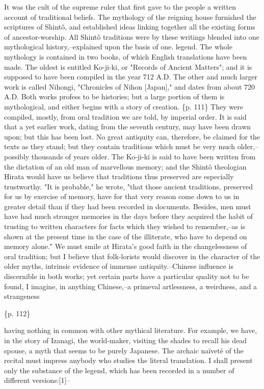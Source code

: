 It was the cult of the supreme ruler that first gave to the people a written account of traditional beliefs. The mythology of the reigning house furnished the scriptures of Shintô, and established ideas linking together all the existing forms of ancestor-worship. All Shintô traditions were by these writings blended into one mythological history,--explained upon the basis of one. legend. The whole mythology is contained in two books, of which English translations have been made. The oldest is entitled Ko-ji-ki, or "Records of Ancient Matters"; and it is supposed to have been compiled in the year 712 A.D. The other and much larger work is called Nihongi, "Chronicles of Nihon [Japan]," and dates from about 720 A.D. Both works profess to be histories; but a large portion of them is mythological, and either begins with a story of creation. \{p. 111\} They were compiled, mostly, from oral tradition we are told, by imperial order. It is said that a yet earlier work, dating from the seventh century, may have been drawn upon; but this has been lost. No great antiquity can, therefore, be claimed for the texts as they stand; but they contain traditions which must be very much older,--possibly thousands of years older. The Ko-ji-ki is said to have been written from the dictation of an old man of marvellous memory; and the Shintô theologian Hirata would have us believe that traditions thus preserved are especially trustworthy. "It is probable," he wrote, "that those ancient traditions, preserved for us by exercise of memory, have for that very reason come down to us in greater detail than if they had been recorded in documents. Besides, men must have had much stronger memories in the days before they acquired the habit of trusting to written characters for facts which they wished to remember,--as is shown at the present time in the case of the illiterate, who have to depend on memory alone." We must smile at Hirata's good faith in the changelessness of oral tradition; but I believe that folk-lorists would discover in the character of the older myths, intrinsic evidence of immense antiquity.--Chinese influence is discernible in both works; yet certain parts have a particular quality not to be found, I imagine, in anything Chinese,--a primeval artlessness, a weirdness, and a strangeness

\{p. 112\}

having nothing in common with other mythical literature. For example, we have, in the story of Izanagi, the world-maker, visiting the shades to recall his dead spouse, a myth that seems to be purely Japanese. The archaic naïveté of the recital must impress anybody who studies the literal translation. I shall present only the substance of the legend, which has been recorded in a number of different versions:[1]--



